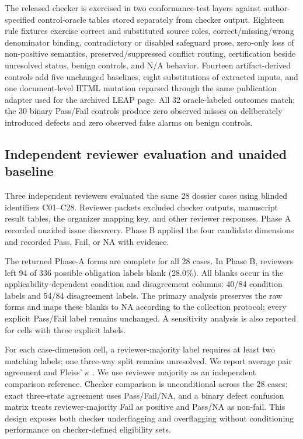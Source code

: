 \documentclass[a4paper,fleqn]{cas-dc}
\begin{document}
The released checker is exercised in two conformance-test layers against author-specified control-oracle tables stored separately from checker output. Eighteen rule fixtures exercise correct and substituted source roles, correct/missing/wrong denominator binding, contradictory or disabled safeguard prose, zero-only loss of non-positive semantics, preserved/suppressed conflict routing, certification beside unresolved status, benign controls, and N/A behavior. Fourteen artifact-derived controls add five unchanged baselines, eight substitutions of extracted inputs, and one document-level HTML mutation reparsed through the same publication adapter used for the archived LEAP page. All 32 oracle-labeled outcomes match; the 30 binary Pass/Fail controls produce zero observed misses on deliberately introduced defects and zero observed false alarms on benign controls.


\subsection{Independent reviewer evaluation and unaided baseline}
Three independent reviewers evaluated the same 28 dossier cases using blinded identifiers C01--C28. Reviewer packets excluded checker outputs, manuscript result tables, the organizer mapping key, and other reviewer responses. Phase A recorded unaided issue discovery. Phase B applied the four candidate dimensions and recorded Pass, Fail, or NA with evidence.

The returned Phase-A forms are complete for all 28 cases. In Phase B, reviewers left 94 of 336 possible obligation labels blank (28.0\%). All blanks occur in the applicability-dependent condition and disagreement columns: 40/84 condition labels and 54/84 disagreement labels. The primary analysis preserves the raw forms and maps these blanks to NA according to the collection protocol; every explicit Pass/Fail label remains unchanged. A sensitivity analysis is also reported for cells with three explicit labels.

For each case-dimension cell, a reviewer-majority label requires at least two matching labels; one three-way split remains unresolved. We report average pair agreement and Fleiss' $\kappa$ \citep{Fleiss1971}. We use reviewer majority as an independent comparison reference. Checker comparison is unconditional across the 28 cases: exact three-state agreement uses Pass/Fail/NA, and a binary defect confusion matrix treats reviewer-majority Fail as positive and Pass/NA as non-fail. This design exposes both checker underflagging and overflagging without conditioning performance on checker-defined eligibility sets.
\end{document}
